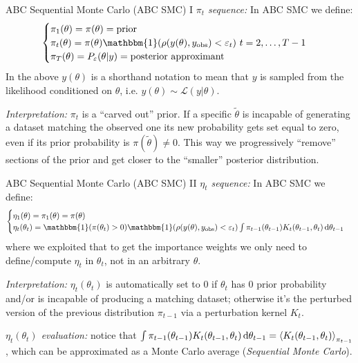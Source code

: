 \documentclass{beamer}
\theoremstyle{remark}
\renewcommand{\L}{\mathcal{L}}
\begin{document}
\begin{frame}{ABC Sequential Monte Carlo (ABC SMC) I}
\textit{$\pi_t$ sequence:} In ABC SMC we define:
\begin{equation*}
    \begin{cases}
        \pi_1(\theta) = \pi(\theta) = \text{prior} \\
        \pi_t(\theta) = \pi(\theta) \mathbbm{1}(\rho(y(\theta), y_{\text{obs}}) < \varepsilon_t) \ t = 2, \dots, T-1\\
        \pi_T(\theta) = P_\varepsilon(\theta|y) = \text{posterior approximant}
    \end{cases}
\end{equation*}
In the above $y(\theta)$ is a shorthand notation to mean that $y$ is sampled from the likelihood conditioned on $\theta$, i.e. $y(\theta) \sim \L(y|\theta)$. \pause



\textit{Interpretation:} $\pi_t$ is a ``carved out'' prior. If a specific $\tilde{\theta}$ is incapable of generating a dataset matching the observed one its new probability gets set equal to zero, even if its prior probability is $\pi(\tilde{\theta})\neq 0$. This way we progressively ``remove'' sections of the prior and get closer to the ``smaller'' posterior distribution.
\end{frame}

\begin{frame}{ABC Sequential Monte Carlo (ABC SMC) II}
\textit{$\eta_t$ sequence:} In ABC SMC we define:
\begin{equation*}
    \begin{cases}
        \eta_1(\theta) = \pi_1(\theta) = \pi(\theta)\\
        \eta_t(\theta_t) = \mathbbm{1}(\pi(\theta_t) > 0)\mathbbm{1}(\rho(y(\theta), y_{\text{obs}}) < \varepsilon_t) \int \pi_{t-1}(\theta_{t-1})K_t(\theta_{t-1}, \theta_t)\dd{\theta_{t-1}}
    \end{cases}
\end{equation*}
where we exploited that to get the importance weights we only need to define/compute $\eta_t$ in $\theta_t$, not in an arbitrary $\theta$.
\pause

\textit{Interpretation:} $\eta_t(\theta_t)$ is automatically set to 0 if $\theta_t$ has 0 prior probability and/or is incapable of producing a matching dataset; otherwise it's the perturbed version of the previous distribution $\pi_{t-1}$ via a perturbation kernel $K_t$.
\pause

\textit{$\eta_t(\theta_t)$ evaluation:} notice that $\int \pi_{t-1}(\theta_{t-1})K_t(\theta_{t-1}, \theta_t)\dd{\theta_{t-1}} = \expval{K_t(\theta_{t-1}, \theta_t)}_{\pi_{t-1}}$, which can be approximated as a Monte Carlo average (\emph{Sequential Monte Carlo}).
\end{frame}
\end{document}
